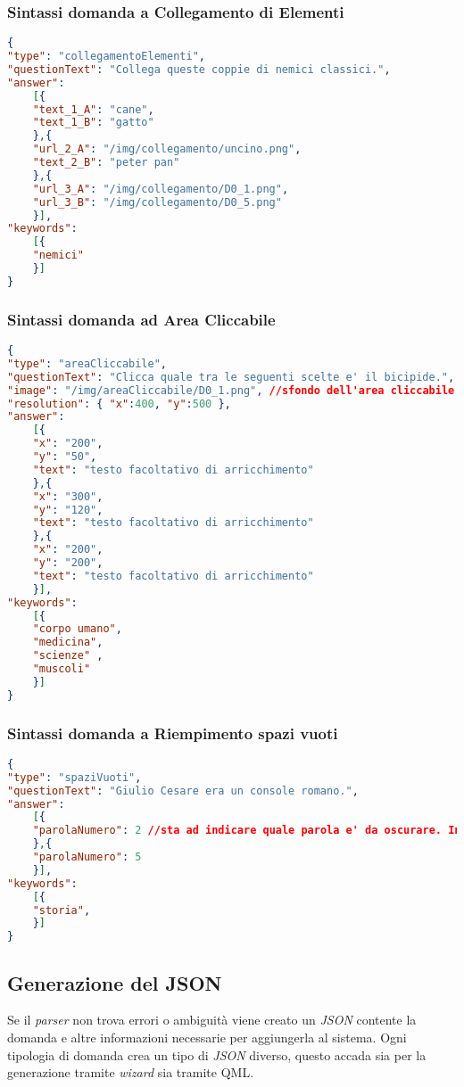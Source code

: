 \subsubsection{Sintassi domanda a Collegamento di Elementi}
\begin{lstlisting}[language=json,firstnumber=1]
{
"type": "collegamentoElementi",
"questionText": "Collega queste coppie di nemici classici.",
"answer":
	[{
	"text_1_A": "cane",
	"text_1_B": "gatto"
	},{
	"url_2_A": "/img/collegamento/uncino.png",
	"text_2_B": "peter pan"
	},{
	"url_3_A": "/img/collegamento/D0_1.png",
	"url_3_B": "/img/collegamento/D0_5.png"
	}],
"keywords":
	[{
	"nemici"
	}]
}
\end{lstlisting}

\subsubsection{Sintassi domanda ad Area Cliccabile}
\begin{lstlisting}[language=json,firstnumber=1]
{
"type": "areaCliccabile",
"questionText": "Clicca quale tra le seguenti scelte e' il bicipide.",
"image": "/img/areaCliccabile/D0_1.png", //sfondo dell'area cliccabile
"resolution": { "x":400, "y":500 },
"answer":
	[{
	"x": "200",
	"y": "50",
	"text": "testo facoltativo di arricchimento"
	},{
	"x": "300",
	"y": "120",
	"text": "testo facoltativo di arricchimento"
	},{
	"x": "200",
	"y": "200",
	"text": "testo facoltativo di arricchimento"
	}],
"keywords":
	[{
	"corpo umano",
	"medicina",
	"scienze" ,
	"muscoli"
	}]
}
\end{lstlisting}

\subsubsection{Sintassi domanda a Riempimento spazi vuoti}
\begin{lstlisting}[language=json,firstnumber=1]
{
"type": "spaziVuoti",
"questionText": "Giulio Cesare era un console romano.",
"answer":
	[{
	"parolaNumero": 2 //sta ad indicare quale parola e' da oscurare. In questo caso la numero 2
	},{
	"parolaNumero": 5
	}],
"keywords":
	[{
	"storia",
	}] 
}
\end{lstlisting}

\subsection{Generazione del JSON}
Se il \textit{parser} non trova errori o ambiguità viene creato un \textit{JSON} contente la domanda e altre informazioni necessarie per aggiungerla al sistema. Ogni tipologia di domanda crea un tipo di \textit{JSON} diverso, questo accada sia per la generazione tramite \textit{wizard} sia tramite QML.

